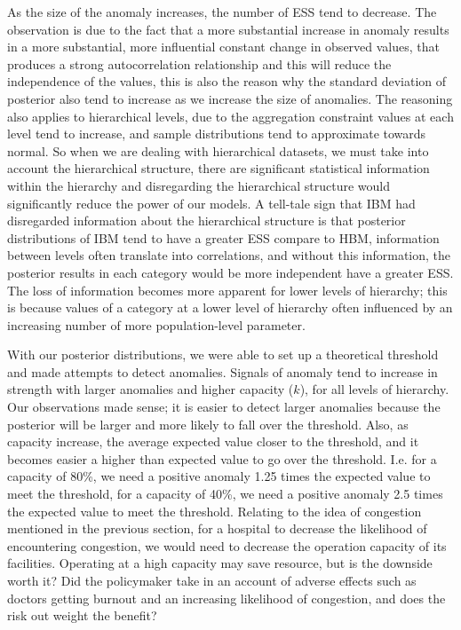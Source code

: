 As the size of the anomaly increases, the number of ESS tend to decrease. The observation is due to the fact that a more substantial increase in anomaly results in a more substantial, more influential constant change in observed values, that produces a strong autocorrelation relationship and this will reduce the independence of the values, this is also the reason why the standard deviation of posterior also tend to increase as we increase the size of anomalies. The reasoning also applies to hierarchical levels, due to the aggregation constraint values at each level tend to increase, and sample distributions tend to approximate towards normal. So when we are dealing with hierarchical datasets, we must take into account the hierarchical structure, there are significant statistical information within the hierarchy and disregarding the hierarchical structure would significantly reduce the power of our models. A tell-tale sign that IBM had disregarded information about the hierarchical structure is that posterior distributions of IBM tend to have a greater ESS compare to HBM, information between levels often translate into correlations, and without this information, the posterior results in each category would be more independent have a greater ESS. The loss of information becomes more apparent for lower levels of hierarchy; this is because values of a category at a lower level of hierarchy often influenced by an increasing number of more population-level parameter. 

\newpara

With our posterior distributions, we were able to set up a theoretical threshold and made attempts to detect anomalies. Signals of anomaly tend to increase in strength with larger anomalies and higher capacity ($k$), for all levels of hierarchy. Our observations made sense; it is easier to detect larger anomalies because the posterior will be larger and more likely to fall over the threshold. Also, as capacity increase, the average expected value closer to the threshold, and it becomes easier a higher than expected value to go over the threshold. I.e. for a capacity of 80\%, we need a positive anomaly 1.25 times the expected value to meet the threshold, for a capacity of 40\%, we need a positive anomaly 2.5 times the expected value to meet the threshold. Relating to the idea of congestion mentioned in the previous section,  for a hospital to decrease the likelihood of encountering congestion, we would need to decrease the operation capacity of its facilities. Operating at a high capacity may save resource, but is the downside worth it? Did the policymaker take in an account of adverse effects such as doctors getting burnout and an increasing likelihood of congestion, and does the risk out weight the benefit? 

